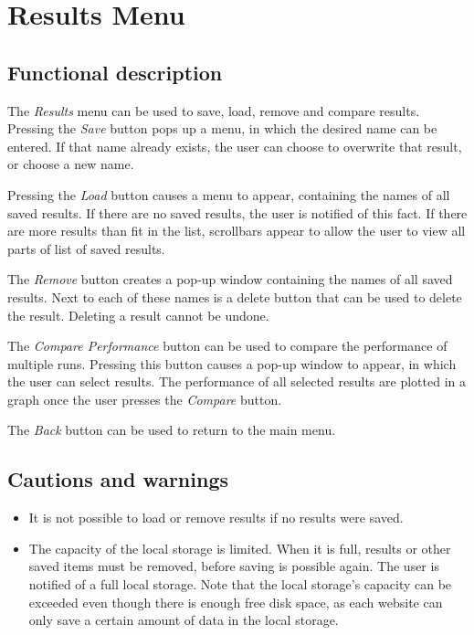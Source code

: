 \section{Results Menu}\label{sec:resultsmenu}
  \subsection*{Functional description}
  The \emph{Results} menu can be used to save, load, remove and compare results. Pressing the \emph{Save} button pops up a menu, in which the desired name can be entered. If that name already exists, the user can choose to overwrite that result, or choose a new name.
  
  Pressing the \emph{Load} button causes a menu to appear, containing the names of all saved results. If there are no saved results, the user is notified of this fact. If there are more results than fit in the list, scrollbars appear to allow the user to view all parts of list of saved results.
  
  The \emph{Remove} button creates a pop-up window containing the names of all saved results. Next to each of these names is a delete button that can be used to delete the result. Deleting a result cannot be undone. 
  
  The \emph{Compare Performance} button can be used to compare the performance of multiple runs. Pressing this button causes a pop-up window to appear, in which the user can select results. The performance of all selected results are plotted in a graph once the user presses the \emph{Compare} button.
  
  The \emph{Back} button can be used to return to the main menu.

  \subsection*{Cautions and warnings}
  \begin{itemize}
    \item It is not possible to load or remove results if no results were saved.
    \item The capacity of the local storage is limited. When it is full, results or other saved \projectname{} items must be removed, before saving is possible again. The user is notified of a full local storage. Note that the local storage's capacity can be exceeded even though there is enough free disk space, as each website can only save a certain amount of data in the local storage.
  \end{itemize}  

